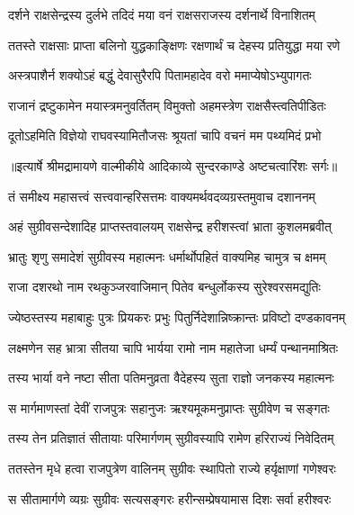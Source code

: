 \twolineshloka
{दर्शने राक्षसेन्द्रस्य दुर्लभे तदिदं मया}
{वनं राक्षसराजस्य दर्शनार्थे विनाशितम्} %

\twolineshloka
{ततस्ते राक्षसाः प्राप्ता बलिनो युद्धकाङ्क्षिणः}
{रक्षणार्थं च देहस्य प्रतियुद्धा मया रणे} %

\twolineshloka
{अस्त्रपाशैर्न शक्योऽहं बद्धुं देवासुरैरपि}
{पितामहादेव वरो ममाप्येषोऽभ्युपागतः} %

\twolineshloka
{राजानं द्रष्टुकामेन मयास्त्रमनुवर्तितम्}
{विमुक्तो अहमस्त्रेण राक्षसैस्त्वतिपीडितः} %

\twolineshloka
{दूतोऽहमिति विज्ञेयो राघवस्यामितौजसः}
{श्रूयतां चापि वचनं मम पथ्यमिदं प्रभो} %


{॥इत्यार्षे श्रीमद्रामायणे वाल्मीकीये आदिकाव्ये सुन्दरकाण्डे अष्टचत्वारिंशः सर्गः॥}


\twolineshloka
{तं समीक्ष्य महासत्त्वं सत्त्ववान्हरिसत्तमः}
{वाक्यमर्थवदव्यग्रस्तमुवाच दशाननम्} %

\twolineshloka
{अहं सुग्रीवसन्देशादिह प्राप्तस्तवालयम्}
{राक्षसेन्द्र हरीशस्त्वां भ्राता कुशलमब्रवीत्} %

\twolineshloka
{भ्रातुः शृणु समादेशं सुग्रीवस्य महात्मनः}
{धर्मार्थोपहितं वाक्यमिह चामुत्र च क्षमम्} %

\twolineshloka
{राजा दशरथो नाम रथकुञ्जरवाजिमान्}
{पितेव बन्धुर्लोकस्य सुरेश्वरसमद्युतिः} %

\twolineshloka
{ज्येष्ठस्तस्य महाबाहुः पुत्रः प्रियकरः प्रभुः}
{पितुर्निदेशान्निष्क्रान्तः प्रविष्टो दण्डकावनम्} %

\twolineshloka
{लक्ष्मणेन सह भ्रात्रा सीतया चापि भार्यया}
{रामो नाम महातेजा धर्म्यं पन्थानमाश्रितः} %

\twolineshloka
{तस्य भार्या वने नष्टा सीता पतिमनुव्रता}
{वैदेहस्य सुता राज्ञो जनकस्य महात्मनः} %

\twolineshloka
{स मार्गमाणस्तां देवीं राजपुत्रः सहानुजः}
{ऋश्यमूकमनुप्राप्तः सुग्रीवेण च सङ्गतः} %

\twolineshloka
{तस्य तेन प्रतिज्ञातं सीतायाः परिमार्गणम्}
{सुग्रीवस्यापि रामेण हरिराज्यं निवेदितम्} %

\twolineshloka
{ततस्तेन मृधे हत्वा राजपुत्रेण वालिनम्}
{सुग्रीवः स्थापितो राज्ये हर्यृक्षाणां गणेश्वरः} %

\twolineshloka
{स सीतामार्गणे व्यग्रः सुग्रीवः सत्यसङ्गरः}
{हरीन्सम्प्रेषयामास दिशः सर्वा हरीश्वरः} %

